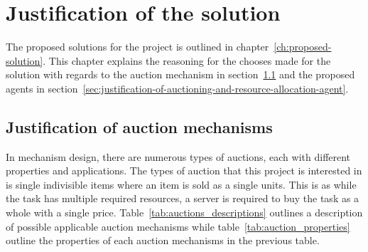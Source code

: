 \chapter{Justification of the solution}\label{ch:justification-of-the-solution}
The proposed solutions for the project is outlined in chapter~\ref{ch:proposed-solution}. This chapter
explains the reasoning for the chooses made for the solution with regards to the auction mechanism in
section~\ref{sec:justification-of-auction-mechanisms} and the proposed agents in
section~\ref{sec:justification-of-auctioning-and-resource-allocation-agent}.

\section{Justification of auction mechanisms}\label{sec:justification-of-auction-mechanisms}
In mechanism design, there are numerous types of auctions, each with different properties and applications.
The types of auction that this project is interested in is single indivisible items where an item is sold as a single
units. This is as while the task has multiple required resources, a server is
required to buy the task as a whole with a single price. Table~\ref{tab:auctions_descriptions} outlines a
description of possible applicable auction mechanisms while table~\ref{tab:auction_properties} outline the properties
of each auction mechanisms in the previous table.

